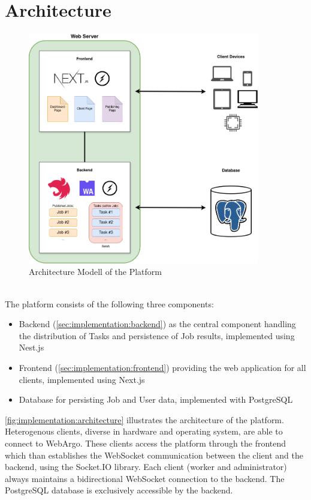 \section{Architecture}
\label{sec:concept:architecture}
\begin{figure}[htbp]
    \centering
    \includegraphics[width=0.9\textwidth]{gfx/figures/WebAssembly-MA.png}
    \caption{Architecture Modell of the Platform}
    \label{fig:implementation:architecture}
\end{figure}
~\\
The platform consists of the following three components:
\begin{itemize}
    \item Backend (\autoref{sec:implementation:backend}) as the central component handling the distribution of Tasks and persistence of Job results, implemented using Nest.js \cite{methodology:nestjs}
    \item Frontend (\autoref{sec:implementation:frontend}) providing the web application for all clients, implemented using Next.js \cite{methodology:nextjs}
    \item Database for persisting Job and User data, implemented with PostgreSQL \cite{methodology:db}
\end{itemize}
\autoref{fig:implementation:architecture} illustrates the architecture of the platform. Heterogenous clients, diverse in hardware and operating system, are able to connect to WebArgo. These clients access the platform through the frontend which than establishes the WebSocket communication between the client and the backend, using the Socket.IO \cite{methodology:websockets2} library. Each client (worker and administrator) always maintains a bidirectional WebSocket connection to the backend. The PostgreSQL \cite{methodology:db} database is exclusively accessible by the backend.

